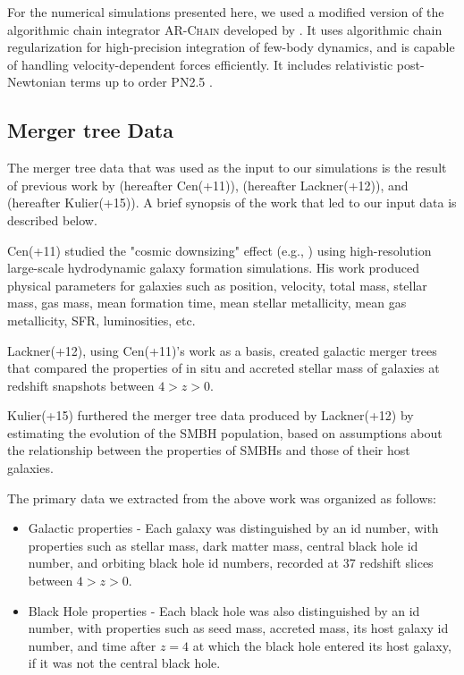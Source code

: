 \documentclass[english, backref,breaklinks,colorlinks,citecolor=blue, usenatbib]{mnras}
\begin{document}
For the numerical simulations presented here, we used a modified version of the algorithmic chain integrator \textsc{AR-Chain} developed by \citet{2006MNRAS.372..219M}. It uses algorithmic chain regularization for high-precision integration of few-body dynamics, and is capable of handling velocity-dependent forces efficiently. It includes relativistic post-Newtonian terms up to order PN2.5 \citep{2008AJ....135.2398M}.


\subsection{Merger tree Data}
The merger tree data that was used as the input to our simulations is the result of previous work by \citet{2011ApJ...741...99C, 2011ApJ...742L..33C, 2012ApJ...753...17C, 2012ApJ...748..121C, 2013ApJ...770..139C} (hereafter Cen(+11)), \citet{2012MNRAS.425..641L} (hereafter Lackner(+12)), and \citet{2015ApJ...799..178K} (hereafter Kulier(+15)).  A brief synopsis of the work that led to our input data is described below.

Cen(+11) studied the "cosmic downsizing" effect (e.g., \citet{1996AJ....112..839C}) using high-resolution large-scale hydrodynamic galaxy formation simulations.  His work produced physical parameters for galaxies such as position, velocity, total mass, stellar mass, gas mass, mean formation time, mean stellar metallicity, mean gas metallicity, SFR, luminosities, etc.

Lackner(+12), using Cen(+11)'s work as a basis, created galactic merger trees that compared the properties of in situ and accreted stellar mass of galaxies at redshift snapshots between $4 > z > 0$.

Kulier(+15) furthered the merger tree data produced by Lackner(+12) by estimating the evolution of the SMBH population, based on assumptions about the relationship between the properties of SMBHs and those of their host galaxies.

The primary data we extracted from the above work was organized as follows:
\begin{itemize}
    \item Galactic properties - Each galaxy was distinguished by an id number, with properties such as stellar mass, dark matter mass, central black hole id number, and orbiting black hole id numbers, recorded at 37 redshift slices between $4 > z > 0$.
    \item Black Hole properties - Each black hole was also distinguished by an id number, with properties such as seed mass, accreted mass, its host galaxy id number, and time after $z=4$ at which the black hole entered its host galaxy, if it was not the central black hole.
\end{itemize}
\end{document}
